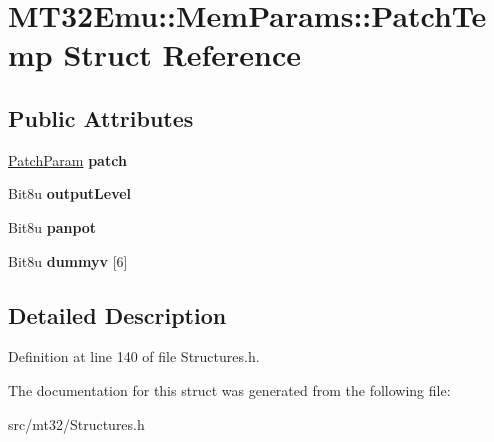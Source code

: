 \hypertarget{structMT32Emu_1_1MemParams_1_1PatchTemp}{\section{M\-T32\-Emu\-:\-:Mem\-Params\-:\-:Patch\-Temp Struct Reference}
\label{structMT32Emu_1_1MemParams_1_1PatchTemp}
}
\subsection*{Public Attributes}
\begin{DoxyCompactItemize}
\item 
\hypertarget{structMT32Emu_1_1MemParams_1_1PatchTemp_aeaf6396d346503a91190bd057cf9cfd1}{\hyperlink{structMT32Emu_1_1PatchParam}{Patch\-Param} {\bfseries patch}}\label{structMT32Emu_1_1MemParams_1_1PatchTemp_aeaf6396d346503a91190bd057cf9cfd1}

\item 
\hypertarget{structMT32Emu_1_1MemParams_1_1PatchTemp_ad09064679bbeb121b85aaa99497a958c}{Bit8u {\bfseries output\-Level}}\label{structMT32Emu_1_1MemParams_1_1PatchTemp_ad09064679bbeb121b85aaa99497a958c}

\item 
\hypertarget{structMT32Emu_1_1MemParams_1_1PatchTemp_ae30c42e4c1020ab1b68991900fefa9dd}{Bit8u {\bfseries panpot}}\label{structMT32Emu_1_1MemParams_1_1PatchTemp_ae30c42e4c1020ab1b68991900fefa9dd}

\item 
\hypertarget{structMT32Emu_1_1MemParams_1_1PatchTemp_ab8e0616b862d7b4d47f199a40cb4b0a1}{Bit8u {\bfseries dummyv} \mbox{[}6\mbox{]}}\label{structMT32Emu_1_1MemParams_1_1PatchTemp_ab8e0616b862d7b4d47f199a40cb4b0a1}

\end{DoxyCompactItemize}


\subsection{Detailed Description}


Definition at line 140 of file Structures.\-h.



The documentation for this struct was generated from the following file\-:\begin{DoxyCompactItemize}
\item 
src/mt32/Structures.\-h\end{DoxyCompactItemize}
